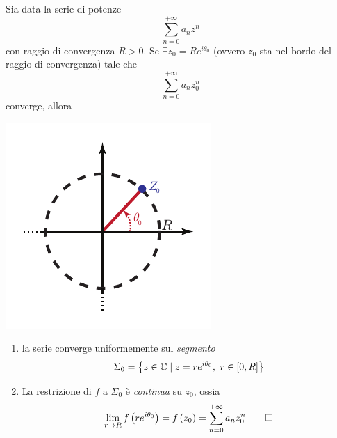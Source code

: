 \begin{theoremaqed}
	Sia data la serie di potenze 
	\begin{equation*}
		\sum_{n=0}^{+\infty}a_nz^n
	\end{equation*}
	con raggio di convergenza $R>0$. Se $\exists z_0=Re^{i\theta_0}$ (ovvero $z_0$ sta nel bordo del raggio di convergenza) tale che
	\begin{equation*}
		\sum_{n=0}^{+\infty}a_nz_0^n
	\end{equation*}
	converge, allora\\
	\begin{minipage}{0.39\textwidth}
		\includegraphics[trim=0cm 0cm 0cm 0cm, clip, scale=1]{images/discoconvergenzaabel.pdf}
	\end{minipage}\hspace{-12mm}
	\begin{minipage}{0.65\textwidth}
		\begin{enumerate}
			\item la serie converge uniformemente sul \textit{segmento}
			\begin{equation}
				\Sigma_0=\left\{z\in\mathbb{C}\mid z=re^{i\theta_0},\ r\in\left[0,R\right]\right\}
			\end{equation}
			\item La restrizione di $f$ a $\Sigma_0$ è \textit{continua} su $z_0$, ossia
			\begin{equation}
				\lim_{r\to R}f\left(re^{i\theta_0}\right)=f\left(z_0\right)=\sum_{n=0}^{+\infty}a_nz_0^n\qedhere
			\end{equation}
		\end{enumerate}
	\end{minipage}
\end{theoremaqed}

